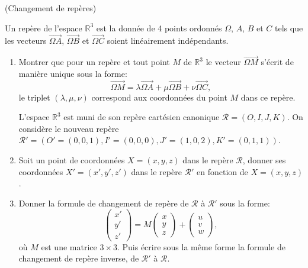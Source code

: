 \documentclass[a4paper,12pt,reqno]{amsart}
\begin{document}
\begin{exo} (Changement de repères)

  Un repère de l'espace $\mathbb{R}^{3}$ est la donnée de 4 points ordonnés $\Omega$, $A$, $B$ et $C$ tels que les vecteurs $\overrightarrow{\Omega A}$, $\overrightarrow{\Omega B}$ et $\overrightarrow{\Omega C}$ soient linéairement indépendants.

  \begin{enumerate}
    \item Montrer que pour un repère et tout point $M$ de $\mathbb{R}^{3}$ le vecteur $\overrightarrow{\Omega M}$ s'écrit de manière unique sous la forme:\vspace{-3mm}
      $$
        \overrightarrow{\Omega M} = \lambda\overrightarrow{\Omega A} + \mu\overrightarrow{\Omega B} + \nu\overrightarrow{\Omega C},
      $$
    le triplet $(\lambda, \mu, \nu)$ correspond aux coordonnées du point $M$ dans ce repère.

    \begin{convention}\unindentlist
      L'espace $\mathbb{R}^{3}$ est muni de son repère cartésien canonique $\mathcal{R}=(O,I,J,K)$. On considère le nouveau repère $\mathcal{R}'=\left( O'=(0, 0, 1), I'=(0, 0, 0), J'=(1, 0, 2), K'=(0, 1, 1) \right)$.
    \end{convention}

    \item Soit un point de coordonnées $X=(x, y, z)$ dans le repère $\mathcal{R}$, donner ses coordonnées $X'=(x', y', z')$ dans le repère $\mathcal{R}'$ en fonction de $X=(x, y, z)$ .

    \item \label{chrep} Donner la formule de changement de repère de $\mathcal{R}$ à $\mathcal{R'}$ sous la forme:
      \[
        \left(\begin{array}{c} x' \\ y' \\ z'\end{array}\right) =
        M \left(\begin{array}{c} x \\ y \\ z \end{array}\right) +
          \left(\begin{array}{c} u \\ v \\ w \end{array}\right),
      \]
    où $M$ est une matrice $3\times3$. Puis écrire sous la même forme la formule de changement de repère inverse, de $\mathcal{R'}$ à $\mathcal{R}$.


\end{enumerate}
\end{exo}
\end{document}
